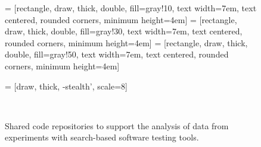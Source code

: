
\begin{figure*}

  \begin{center}


     = [rectangle, draw, thick, double, fill=gray!10, text width=7em, text centered, rounded corners, minimum height=4em]
     = [rectangle, draw, thick, double, fill=gray!30, text width=7em, text centered, rounded corners, minimum height=4em]
     = [rectangle, draw, thick, double, fill=gray!50, text width=7em, text centered, rounded corners, minimum height=4em]


     = [draw, thick, -stealth', scale=8]


  \end{center}

  \caption{Shared code repositories to support the analysis of data from experiments with search-based software testing
  tools.}~\label{fig:statistical_repositories}

\end{figure*}
